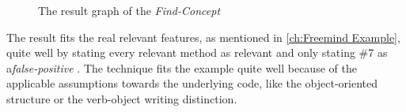 \begin{figure}
	\centering
	\caption{The result graph of the \textit{Find-Concept}}
	\label{graph:Find-Concept - result}
\end{figure}
The result fits the real relevant features, as mentioned in \autoref{ch:Freemind Example}, quite well by stating every relevant method as relevant and only stating \#7 as a\textit{false-positive} . The technique fits the example quite well because of the applicable assumptions towards the underlying code, like the object-oriented structure or the verb-object writing distinction.

